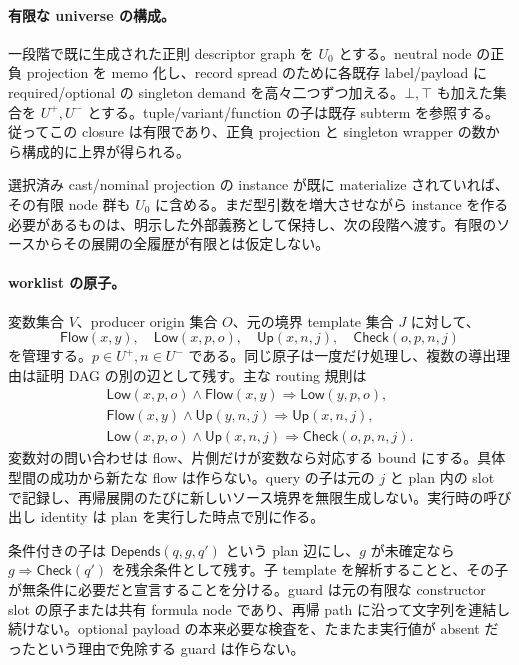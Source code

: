 \documentclass[11pt,a4paper]{article}
\theoremstyle{remark}
\begin{document}
\paragraph{有限な universe の構成。}
一段階で既に生成された正則 descriptor graph を $U_0$ とする。neutral node の正負 projection を memo 化し、record spread のために各既存 label/payload に required/optional の singleton demand を高々二つずつ加える。$\bot,\top$ も加えた集合を $U^+,U^-$ とする。tuple/variant/function の子は既存 subterm を参照する。従ってこの closure は有限であり、正負 projection と singleton wrapper の数から構成的に上界が得られる。

選択済み cast/nominal projection の instance が既に materialize されていれば、その有限 node 群も $U_0$ に含める。まだ型引数を増大させながら instance を作る必要があるものは、明示した外部義務として保持し、次の段階へ渡す。有限のソースからその展開の全履歴が有限とは仮定しない。

\paragraph{worklist の原子。}
変数集合 $V$、producer origin 集合 $O$、元の境界 template 集合 $J$ に対して、
\[
 \mathsf{Flow}(x,y),\quad
 \mathsf{Low}(x,p,o),\quad
 \mathsf{Up}(x,n,j),\quad
 \mathsf{Check}(o,p,n,j)
\]
を管理する。$p\in U^+,n\in U^-$ である。同じ原子は一度だけ処理し、複数の導出理由は証明 DAG の別の辺として残す。主な routing 規則は
\[
\begin{gathered}
 \mathsf{Low}(x,p,o)\land\mathsf{Flow}(x,y)
       \Rightarrow\mathsf{Low}(y,p,o),\\
 \mathsf{Flow}(x,y)\land\mathsf{Up}(y,n,j)
       \Rightarrow\mathsf{Up}(x,n,j),\\
 \mathsf{Low}(x,p,o)\land\mathsf{Up}(x,n,j)
       \Rightarrow\mathsf{Check}(o,p,n,j).
\end{gathered}
\]
変数対の問い合わせは flow、片側だけが変数なら対応する bound にする。具体型間の成功から新たな flow は作らない。query の子は元の $j$ と plan 内の slot で記録し、再帰展開のたびに新しいソース境界を無限生成しない。実行時の呼び出し identity は plan を実行した時点で別に作る。

条件付きの子は $\mathsf{Depends}(q,g,q')$ という plan 辺にし、$g$ が未確定なら $g\Rightarrow\mathsf{Check}(q')$ を残余条件として残す。子 template を解析することと、その子が無条件に必要だと宣言することを分ける。guard は元の有限な constructor slot の原子または共有 formula node であり、再帰 path に沿って文字列を連結し続けない。optional payload の本来必要な検査を、たまたま実行値が absent だったという理由で免除する guard は作らない。
\end{document}
